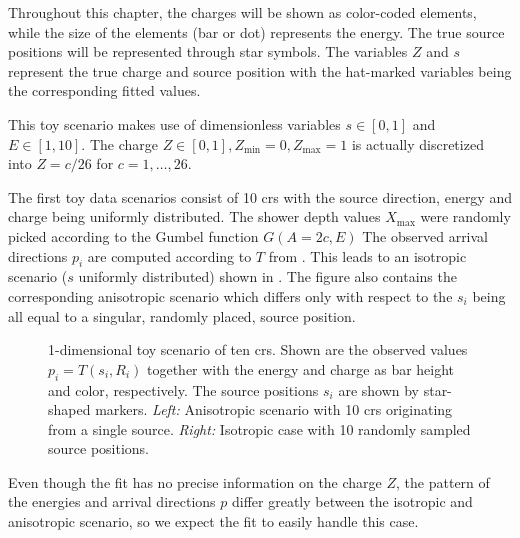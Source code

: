 Throughout this chapter, the charges will be shown as color-coded elements, while the size of the elements (bar or dot) represents the energy. The true source positions will be represented through star symbols. The variables \(Z\) and \(s\) represent the true charge and source position with the hat-marked variables being the corresponding fitted values.


This toy scenario makes use of dimensionless variables \(s \in [0,1]\) and \(E \in [1,10]\). The charge \(Z \in [0,1], Z_{\min}=0, Z_{\max}=1\) is actually discretized into \(Z= c/26\) for \(c=1,\ldots, 26\).

The first toy data scenarios consist of 10 \glspl{cr} with the source direction, energy and charge being uniformly distributed. The shower depth values \(X_{\max}\) were randomly picked according to the Gumbel function \(G(A=2c, E)\) The observed arrival directions \(p_i\) are computed according to \(T\) from . This leads to an isotropic scenario (\(s\) uniformly distributed) shown in . The figure also contains the corresponding anisotropic scenario which differs only with respect to the \(s_i\) being all equal to a singular, randomly placed, source position.
\begin{figure}[ht!]
    \centering
    \begin{minipage}{0.49\textwidth}
    \end{minipage}
    \begin{minipage}{0.49\textwidth}
    \end{minipage}
    \caption{1-dimensional toy scenario of ten \glspl{cr}. Shown are the observed values \(p_i = T(s_i, R_i)\) together with the energy and charge as bar height and color, respectively. The source positions \(s_i\) are shown by star-shaped markers. \emph{Left:} Anisotropic scenario with 10 \glspl{cr} originating from a single source. \emph{Right:} Isotropic case with 10 randomly sampled source positions.}\label{fig:1dim-hidden}
\end{figure}

Even though the fit has no precise information on the charge \(Z\), the pattern of the energies and arrival directions \(p\) differ greatly between the isotropic and anisotropic scenario, so we expect the fit to easily handle this case.

